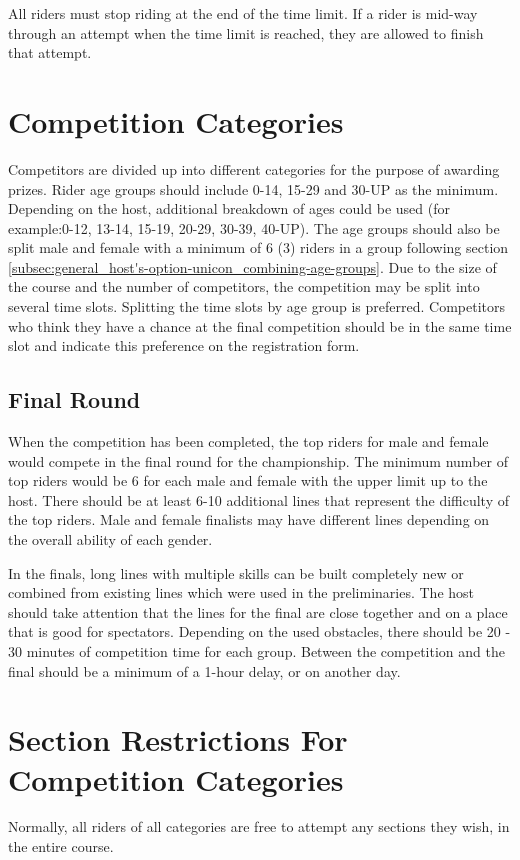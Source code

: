 All riders must stop riding at the end of the time limit. 
If a rider is mid-way through an attempt when the time limit is reached, they are allowed to finish that attempt.

\section{Competition Categories}
Competitors are divided up into different categories for the purpose of awarding prizes. 
Rider age groups should include 0-14, 15-29 and 30-UP as the minimum. 
Depending on the host, additional breakdown of ages could be used (for example:0-12, 13-14, 15-19, 20-29, 30-39, 40-UP). 
The age groups should also be split male and female with a minimum of 6 (3) riders in a group following section \ref{subsec:general_host's-option-unicon_combining-age-groups}.
Due to the size of the course and the number of competitors, the competition may be split into several time slots. 
Splitting the time slots by age group is preferred. 
Competitors who think they have a chance at the final competition should be in the same time slot and indicate this preference on the registration form.

\subsection{Final Round}
When the competition has been completed, the top riders for male and female would compete in the final round for the championship.
The minimum number of top riders would be 6 for each male and female with the upper limit up to the host. 
There should be at least 6-10 additional lines that represent the difficulty of the top riders. 
Male and female finalists may have different lines depending on the overall ability of each gender.

In the finals, long lines with multiple skills can be built completely new or combined from existing lines which were used in the preliminaries. 
The host should take attention that the lines for the final are close together and on a place that is good for spectators. Depending on the used obstacles, there should be 20 - 30 minutes of competition time for each group. 
Between the competition and the final should be a minimum of a 1-hour delay, or on another day.
 
\section{Section Restrictions For Competition Categories \label{sec:trials_section-restrictions-for-competition-categories}}
Normally, all riders of all categories are free to attempt any sections they wish, in the entire course.

